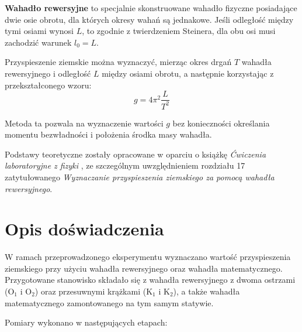 \documentclass[a4paper,12pt]{article}
\begin{document}
\textbf{Wahadło rewersyjne} to specjalnie skonstruowane wahadło fizyczne posiadające dwie osie obrotu, dla których okresy wahań są jednakowe. Jeśli odległość między tymi osiami wynosi $L$, to zgodnie z twierdzeniem Steinera, dla obu osi musi zachodzić warunek $l_0 = L$.

Przyspieszenie ziemskie można wyznaczyć, mierząc okres drgań $T$ wahadła rewersyjnego i odległość $L$ między osiami obrotu, a następnie korzystając z przekształconego wzoru:
\begin{equation}
  \label{eq:przyspieszenie}
  g = 4\pi^2\frac{L}{T^2}
\end{equation}

Metoda ta pozwala na wyznaczenie wartości $g$ bez konieczności określania momentu bezwładności i położenia środka masy wahadła.

Podstawy teoretyczne zostały opracowane w oparciu o książkę \textit{Ćwiczenia laboratoryjne z fizyki} \cite{Drynski1976}, ze szczególnym uwzględnieniem rozdziału 17 zatytułowanego \textit{Wyznaczanie przyspieszenia ziemskiego za pomocą wahadła rewersyjnego}.

\section{Opis doświadczenia}

W ramach przeprowadzonego eksperymentu wyznaczano wartość przyspieszenia ziemskiego przy użyciu wahadła rewersyjnego oraz wahadła matematycznego. Przygotowane stanowisko składało się z wahadła rewersyjnego z dwoma ostrzami (O$_1$ i O$_2$) oraz przesuwnymi krążkami (K$_1$ i K$_2$), a także wahadła matematycznego zamontowanego na tym samym statywie.

Pomiary wykonano w następujących etapach:
\end{document}
